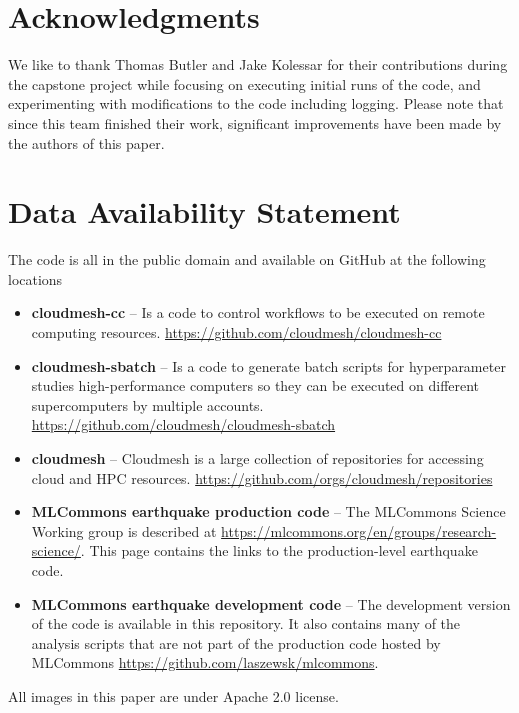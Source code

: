 \documentclass[utf8]{FrontiersinVancouver} %
\begin{document}
\section*{Acknowledgments}

We like to thank Thomas Butler and Jake Kolessar for their
contributions during the capstone project while focusing on executing
initial runs of the code, and experimenting with modifications to the
code including logging. Please note that since this team finished
their work, significant improvements have been made by the authors of
this paper.



\section*{Data Availability Statement}

The code is all in the public domain and available on GitHub at the following locations

\begin{itemize}

\item {\bf cloudmesh-cc} -- Is a code to control workflows to be executed on
  remote computing
  resources. \url{https://github.com/cloudmesh/cloudmesh-cc}

\item {\bf cloudmesh-sbatch} -- Is a code to generate batch scripts for
  hyperparameter studies high-performance computers so they can be
  executed on different supercomputers by multiple
  accounts. \url{https://github.com/cloudmesh/cloudmesh-sbatch}

\item {\bf cloudmesh} -- Cloudmesh is a large collection of repositories for
  accessing cloud and HPC
  resources. \url{https://github.com/orgs/cloudmesh/repositories}

\item {\bf MLCommons earthquake production code} -- The MLCommons Science
  Working group is described at
  \url{https://mlcommons.org/en/groups/research-science/}. This page
  contains the links to the production-level earthquake code.

\item {\bf MLCommons earthquake development code} -- The development version of
  the code is available in this repository. It also contains many of
  the analysis scripts that are not part of the production code
  hosted by MLCommons \url{https://github.com/laszewsk/mlcommons}.

\end{itemize}

All images in this paper are under Apache 2.0 license.


% 



\end{document}
